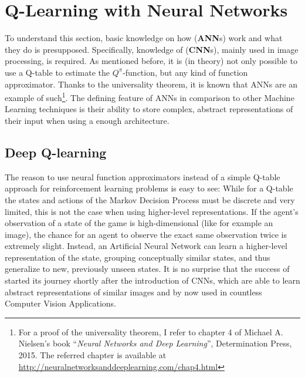 \section{Q-Learning with Neural Networks}

To understand this section, basic knowledge on how  (\textbf{ANN}s) work and what they do is presupposed. Specifically, knowledge of  (\textbf{CNN}s)\cite{yann_lecun_gradient-based_1998}, mainly used in image processing, is required. As mentioned before, it is (in theory) not only possible to use a Q-table to estimate the $Q^\pi$-function, but any kind of function approximator. Thanks to the universality theorem, it is known that ANNs are an example of such\footnote{For a proof of the universality theorem, I refer to chapter 4 of Michael A. Nielsen's book ``\textit{Neural Networks and Deep Learning}'', Determination Press, 2015. The referred chapter is available at \url{http://neuralnetworksanddeeplearning.com/chap4.html}}. The defining feature of ANNs in comparison to other Machine Learning techniques is their ability to store complex, abstract representations of their input when using a  enough architecture.

\subsection{Deep Q-learning} \label{ch:DQN}

\noindent The reason to use neural function approximators instead of a simple Q-table approach for reinforcement learning problems is easy to see: While for a Q-table the states and actions of the Markov Decision Process must be discrete and very limited, this is not the case when using higher-level representations. If the agent's observation of a state of the game is high-dimensional (like for example an image), the chance for an agent to observe the exact same observation twice is extremely slight. Instead, an Artificial Neural Network can learn a higher-level representation of the state, grouping conceptually similar states, and thus generalize to new, previously unseen states. It is no surprise that the success of  started its journey shortly after the introduction of CNNs, which are able to learn abstract representations of similar images and by now used in countless Computer Vision Applications. \\%


